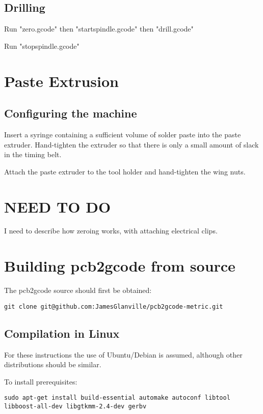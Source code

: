 \documentclass[a4paper,11pt]{article}  %
\begin{document}
\subsection{Drilling}
Run "zero.gcode" then "startspindle.gcode" then "drill.gcode"

Run "stopspindle.gcode"

\section{Paste Extrusion}

\subsection{Configuring the machine}
Insert a syringe containing a sufficient volume of solder paste into
the paste extruder. Hand-tighten the extruder so that there is only a 
small amount of slack in the timing belt.

Attach the paste extruder to the tool holder and hand-tighten the wing 
nuts.




\newpage
\appendix
\appendixpage
\addappheadtotoc






\section{NEED TO DO}
I need to describe how zeroing works, with attaching electrical clips.

\newpage
\section{Building pcb2gcode from source}

The pcb2gcode source should first be obtained:
\begin{lstlisting}[frame=single]
git clone git@github.com:JamesGlanville/pcb2gcode-metric.git
\end{lstlisting}

\subsection{Compilation in Linux}
For these instructions the use of Ubuntu/Debian is assumed, although other distributions should be similar.

To install prerequisites:
\begin{lstlisting}[frame=single,breaklines=true]
sudo apt-get install build-essential automake autoconf libtool libboost-all-dev libgtkmm-2.4-dev gerbv
\end{lstlisting}
\end{document}
